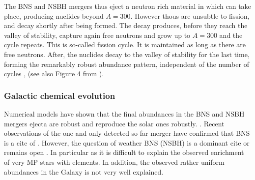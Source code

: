 The \ac{BNS} and \ac{NSBH} mergers thus eject a neutron rich material in which \rproc{} can take place, producing nuclides beyond $A=300$. However thous are unsubtle to fission, and decay shortly after being formed. The decay produces, before they reach the valley of stability, capture again free neutrons and grow up to $A=300$ and the cycle repeats. This is so-called 
fission cycle. 
It is maintained as long as there are free neutrons. After, the nuclides decay to the valley of stability for the last time, forming the remarkably robust abundance pattern, independent of the number of cycles \citep{Korobkin:2012uy,Bauswein:2013,Mendoza-Temis:2014mja}, (see also Figure 4 from \citet{Korobkin:2012uy}).


\subsubsection{Galactic chemical evolution}

Numerical models have shown that the final \rproc{} abundances in the \ac{BNS} and \ac{NSBH} mergers ejecta are robust and reproduce the solar ones robustly. \citep{Freiburghaus:1999,Goriely:2011vg,Goriely:2015fqa,Wanajo:2014,Just:2014,Radice:2016dwd}\red{[Refs]}. Recent observations of the one and only detected so far merger have confirmed that \ac{BNS} is a cite of \rproc{} \red{[Refs]}.
However, the question of weather \ac{BNS} (\ac{NSBH}) is a dominant cite or \rproc{} \nuc{} remains open \citep{Qian:2000bh,Argast:2003he,Matteucci:2014}. 
In particular as it is difficult to explain the observed enrichment of very \ac{MP} stars with \rproc{} elements. In addition, the observed rather uniform \rproc{} abundances in the Galaxy is not very well explained.


